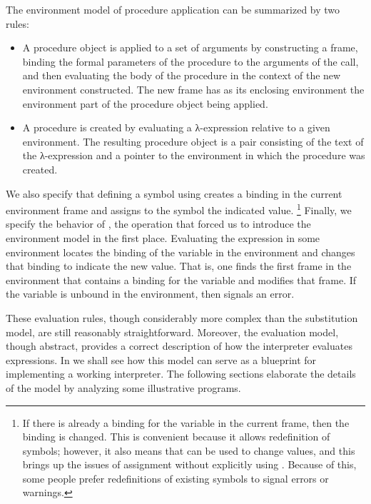 The environment model of procedure application can be summarized by two rules:
\begin{itemize}

	\item
		A procedure object is applied to a set of arguments by constructing a frame, binding the formal parameters of the procedure to the arguments of the call, and then evaluating the body of the procedure in the context of the new environment constructed.
		The new frame has as its enclosing environment the environment part of the procedure object being applied.

	\item
		A procedure is created by evaluating a λ-expression relative to a given environment.
		The resulting procedure object is a pair consisting of the text of the λ-expression and a pointer to the environment in which the procedure was created.

\end{itemize}

We also specify that defining a symbol using  creates a binding in the current environment frame and assigns to the symbol the indicated value.%
\footnote{
	If there is already a binding for the variable in the current frame, then the binding is changed.
	This is convenient because it allows redefinition of symbols;
	however, it also means that  can be used to change values, and this brings up the issues of assignment without explicitly using .
	Because of this, some people prefer redefinitions of existing symbols to signal errors or warnings.
}
Finally, we specify the behavior of , the operation that forced us to introduce the environment model in the first place.
Evaluating the expression  in some environment locates the binding of the variable in the environment and changes that binding to indicate the new value.
That is, one finds the first frame in the environment that contains a binding for the variable and modifies that frame.
If the variable is unbound in the environment, then  signals an error.

These evaluation rules, though considerably more complex than the substitution model, are still reasonably straightforward.
Moreover, the evaluation model, though abstract, provides a correct description of how the interpreter evaluates expressions.
In  we shall see how this model can serve as a blueprint for implementing a working interpreter.
The following sections elaborate the details of the model by analyzing some illustrative programs.
